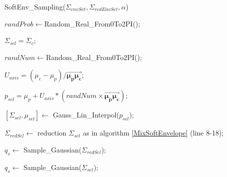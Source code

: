 \documentclass[letterpaper, 10 pt, conference]{ieeeconf}  %
\newcommand{\mb}[1]{{\boldsymbol{#1}}}
\begin{document}
\begin{algorithm}[H]
 \caption{SoftEnv\_Sampling($\Sigma_{envSet}, \Sigma_{redEnvSet},\alpha$)}\label{SoftEnv_Sampling}


\setcounter{AlgoLine}{0}
\BlankLine
 $randProb \leftarrow $Random\_Real\_From0To2PI();
 
	{
		$\Sigma_{sel} = \Sigma_c$;
	}
	\Else
	{
	 	$randNum \leftarrow $Random\_Real\_From0To2PI();
	 	
	 	$U_{axis}=(\mu_c - \mu_p)/\overrightarrow{{\mb{\mu_p}\mb{\mu_{c}}}}$;
	 	
	 	$p_{sel}=\mu_p+U_{axis}*(randNum \times \overrightarrow{{\mb{\mu_p}\mb{\mu_{c}}}})$;
	 	
	 	$[\Sigma_{sel},\mu_{sel}] \leftarrow$ Gauss\_Lin\_Interpol($p_{sel}$);
	}
	{
		$\Sigma_{redSel} \leftarrow $ reduction $\Sigma_{sel}$ as in algorithm \ref{MixSoftEnvelope} (line 8-18);
		
		$q_s \leftarrow $ Sample\_Gaussian($\Sigma_{redSel}$);
	}
	\Else
	{
		$q_s \leftarrow $ Sample\_Gaussian($\Sigma_{sel}$);
	}
\end{algorithm}
\end{document}
